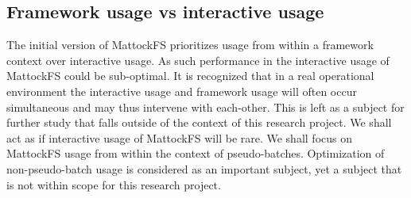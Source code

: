 \subsection{Framework usage vs interactive usage}
The initial version of MattockFS prioritizes usage from within a framework context over interactive usage. As such performance in the interactive usage of MattockFS could be sub-optimal. It is recognized that in a real operational environment the interactive usage and framework usage will often occur simultaneous and may thus intervene with each-other. This is left as a subject for further study that falls outside of the context of this research project. We shall act as if interactive usage of MattockFS will be rare. We shall focus on MattockFS usage from within the context of pseudo-batches. Optimization of non-pseudo-batch usage is considered as an important subject, yet a subject that is not within scope for this research project.
